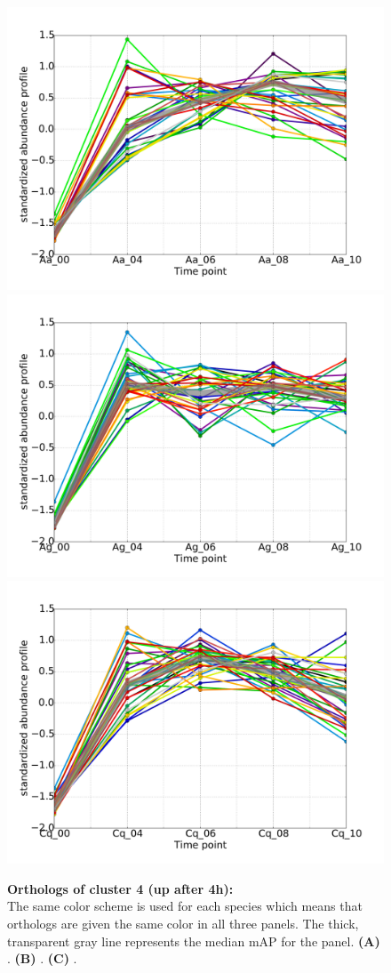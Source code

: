 \begin{figure}[p]
% 
\subcaptionbox{\label{fig:cluster4-Aa}}
{\includegraphics[width=.5\linewidth]{figures/figs/ecr_and_insects_ptci_20130918_orthodb7/upAfter4_gene_profiles_from_cummerbund/Aa_upAfter4_cls4_Ag_target_FPKMs_vb_orthos.pdf}}
%
\subcaptionbox{\label{fig:cluster4-Ag}}
{\includegraphics[width=.5\linewidth]{figures/figs/ecr_and_insects_ptci_20130918_orthodb7/upAfter4_gene_profiles_from_cummerbund/Ag_upAfter4_cls4_Ag_target_FPKMs_vb_orthos.pdf}}
%
\subcaptionbox{\label{fig:cluster4-Cq}}
{\includegraphics[width=.5\linewidth]{figures/figs/ecr_and_insects_ptci_20130918_orthodb7/upAfter4_gene_profiles_from_cummerbund/Cq_upAfter4_cls4_Ag_target_FPKMs_vb_orthos.pdf}}
% 
\caption[Orthologs of cluster 4]{\sf \textbf{Orthologs of cluster 4 (up after 4h):}\\
The same color scheme is used for each species which means that orthologs are given the same color in all three panels.
The thick, transparent gray line represents the median \gls{mAP} for the panel.
\textbf{(A)} \Aa.
\textbf{(B)} \Ag.
\textbf{(C)} \Cq.
}\label{fig:cluster4}
\end{figure}